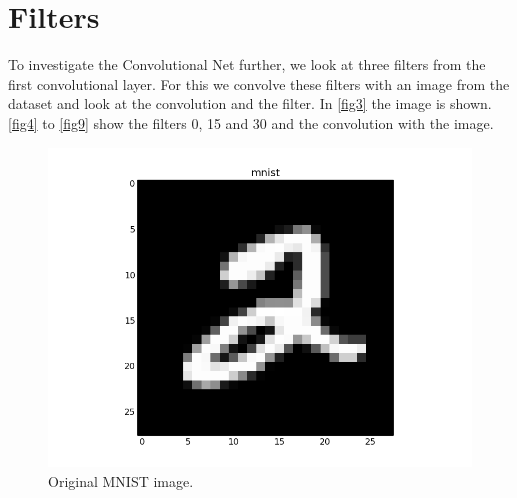 \documentclass{article}
\begin{document}
\section{Filters}

To investigate the Convolutional Net further, we look at three filters from the first convolutional layer.
For this we convolve these filters with an image from the dataset and look at the convolution and the filter.
In \autoref{fig3} the image is shown.
\autoref{fig4} to \autoref{fig9} show the filters 0, 15 and 30 and the convolution with the image.

\begin{figure}[h]
	\centering
	\includegraphics[width = .8\textwidth]{graphics/digit.png}
	\caption{Original MNIST image.}
	\label{fig3}
\end{figure}

\newpage
\end{document}
